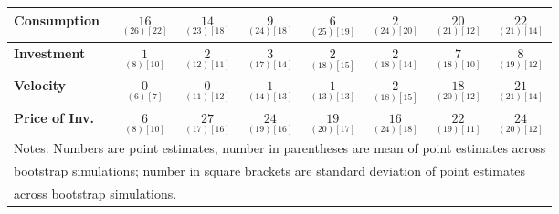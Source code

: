 \documentclass{article}
\begin{document}
\begin{tabular}{|l|c|@{}c|c|@{}c|c|@{}c|c|}
 \textbf{Consumption} & $\underset{( 26) [ 22]}{ 16}$ & $\underset{( 23) [ 18]}{ 14}$ & $\underset{( 24) [ 18]}{  9}$ & $\underset{( 25) [ 19]}{  6}$ & $\underset{( 24) [ 20]}{  2}$ & $\underset{( 21) [ 12]}{ 20}$ & $\underset{( 21) [ 14]}{ 22}$ \\ \hline 
 \textbf{Investment} & $\underset{(  8) [ 10]}{  1}$ & $\underset{( 12) [ 11]}{  2}$ & $\underset{( 17) [ 14]}{  3}$ & $\underset{( 18) [ 15]}{  2}$ & $\underset{( 18) [ 14]}{  2}$ & $\underset{( 18) [ 10]}{  7}$ & $\underset{( 19) [ 12]}{  8}$ \\ \hline 
 \textbf{Velocity} & $\underset{(  6) [  7]}{  0}$ & $\underset{( 11) [ 12]}{  0}$ & $\underset{( 14) [ 13]}{  1}$ & $\underset{( 13) [ 13]}{  1}$ & $\underset{( 18) [ 15]}{  2}$ & $\underset{( 20) [ 12]}{ 18}$ & $\underset{( 21) [ 14]}{ 21}$ \\ \hline 
 \textbf{Price of Inv.} & $\underset{(  8) [ 10]}{  6}$ & $\underset{( 17) [ 16]}{ 27}$ & $\underset{( 19) [ 16]}{ 24}$ & $\underset{( 20) [ 17]}{ 19}$ & $\underset{( 24) [ 18]}{ 16}$ & $\underset{( 19) [ 11]}{ 22}$ & $\underset{( 20) [ 12]}{ 24}$ \\ \hline 
 \multicolumn{8}{|l|}{Notes: Numbers are point estimates, number in 
 parentheses are mean of point estimates across} \\ \hline 
 \multicolumn{8}{|l|}{bootstrap simulations; number in square brackets are 
 standard deviation of point estimates} \\ \hline 
 \multicolumn{8}{|l|}{across bootstrap simulations.} \\ \hline 
 \end{tabular} 
\end{document}
